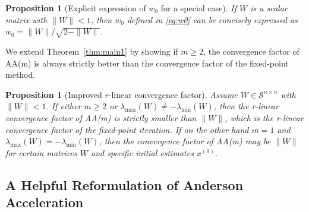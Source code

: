 \documentclass[11pt]{article}
\newtheorem{proposition}[theorem]{Proposition}
\newcommand{\Symn}{\mathcal{S}^{n \times n}}
\begin{document}
{\color{black}
\begin{proposition}[Explicit expression of $w_0$ for a special case] \label{cor:special}
If $W$ is a scalar matrix with $\|W\|<1$, then $w_0$ defined in \eqref{eq:w0} can be concisely expressed as $w_0=\|W\|/\sqrt{2-\|W\|}$. 
\end{proposition}
}
We extend {\color{black}Theorem~\ref{thm:main1}} by showing if $m\geq 2$, 
the convergence factor of AA(m) is always strictly better than the {\color{black} convergence factor} of the fixed-point method.
\begin{proposition}
[Improved $r$-linear convergence factor]
\label{cor:main}%
Assume $W \in \Symn$ {\color{black}with $\|W\|<1$}. If either $m\geq 2$ or $\lambda_{\max}(W)\neq -\lambda_{\min}(W)$, then 
 the
r-linear convergence factor of AA(m) is strictly smaller than $\|W\|$, which is the r-linear convergence factor of the fixed-point iteration. 
If on the other hand  
$m =1 $ and $\lambda_{\max}(W)=-\lambda_{\min}(W)$, then the convergence factor of AA(m) may be $\|W\|$ for {\color{black}certain  matrices $W$ and specific initial estimates  $x^{(0)}$}. 
\end{proposition}

\subsection{A Helpful Reformulation of Anderson Acceleration}
\label{sec:reformulate_AA}
\end{document}
